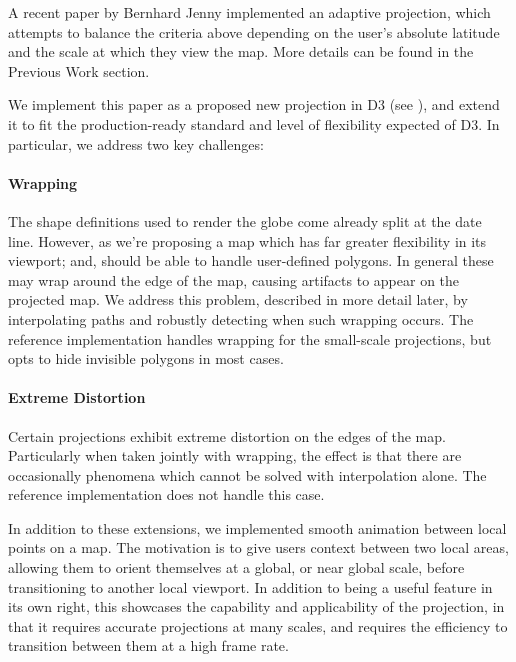 A recent paper by Bernhard Jenny \cite{key:2012jenny-maps} implemented an
  adaptive projection, which attempts to balance the criteria above
  depending on the user's absolute latitude and the scale at which they
  view the map.
More details can be found in the Previous Work section.

We implement this paper as a proposed new projection in D3
  (see ), and extend it to
  fit the production-ready standard and level of flexibility expected of D3.
In particular, we address two key challenges:

\paragraph{Wrapping}
The shape definitions used to render the globe come already split at the date
  line.
However, as we're proposing a map which has far greater flexibility in its
  viewport; and, should be able to handle user-defined polygons.
In general these may wrap around the edge of the map, causing artifacts to
  appear on the projected map.
We address this problem, described in more detail later, by interpolating paths
  and robustly detecting when such wrapping occurs.
The reference implementation handles wrapping for the small-scale projections,
  but opts to hide invisible polygons in most cases.

\paragraph{Extreme Distortion}
Certain projections exhibit extreme distortion on the edges of the map.
Particularly when taken jointly with wrapping, the effect is that there are
  occasionally phenomena which cannot be solved with interpolation alone.
The reference implementation does not handle this case.

In addition to these extensions, we implemented smooth animation between
  local points on a map.
The motivation is to give users context between two local areas, allowing them
  to orient themselves at a global, or near global scale, before transitioning
  to another local viewport.
In addition to being a useful feature in its own right, this showcases the
  capability and applicability of the projection, in that it requires accurate
  projections at many scales, and requires the efficiency to transition
  between them at a high frame rate.
